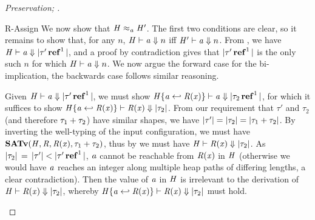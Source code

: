 \begin{proof}[Preservation; ]
\begin{rneqncase}{R-Assign}
    We now show that $ \mathit{H}   \approx _ {\mathit{a}}   \mathit{H'} $. The first two conditions are clear, so it
    remains to show that, for any $n$, $ \mathit{H} \vdash   \mathit{a}  \Downarrow  n $ iff $ \mathit{H'} \vdash   \mathit{a}  \Downarrow  n $.
    From , we have $ \mathit{H} \vdash   \mathit{a}  \Downarrow   |  \tau'  \operatorname{\mathbf{ref}}^{ 1 }  |  $, and
    a proof by contradiction gives that $ |  \tau'  \operatorname{\mathbf{ref}}^{ 1 }  | $ is the only such $n$
    for which $ \mathit{H} \vdash   \mathit{a}  \Downarrow  n $. We now argue the forward case for the bi-implication,
    the backwards case follows similar reasoning.

    Given $ \mathit{H} \vdash   \mathit{a}  \Downarrow   |  \tau'  \operatorname{\mathbf{ref}}^{ 1 }  |  $, we  must show $ \mathit{H}  \{  \mathit{a}  \hookleftarrow  \mathit{R}  (  \mathit{x}  )  \} \vdash   \mathit{a}  \Downarrow   |  \tau_{{\mathrm{2}}}  \operatorname{\mathbf{ref}}^{ 1 }  |  $, for which it suffices to show
    $ \mathit{H}  \{  \mathit{a}  \hookleftarrow  \mathit{R}  (  \mathit{x}  )  \} \vdash   \mathit{R}  (  \mathit{x}  )  \Downarrow   | \tau_{{\mathrm{2}}} |  $. 
    From our requirement that $\tau'$ and $\tau_{{\mathrm{2}}}$
    (and therefore $\tau_{{\mathrm{1}}}  +  \tau_{{\mathrm{2}}}$) have similar shapes, we have $ | \tau' |   =   | \tau_{{\mathrm{2}}} |   =   | \tau_{{\mathrm{1}}}  +  \tau_{{\mathrm{2}}} | $.
    By inverting the well-typing of the input configuration, we must have $ \mathbf{SATv} ( \mathit{H} , \mathit{R} , \mathit{R}  (  \mathit{x}  ) , \tau_{{\mathrm{1}}}  +  \tau_{{\mathrm{2}}} ) $,
    thus by  we must have $ \mathit{H} \vdash   \mathit{R}  (  \mathit{x}  )  \Downarrow   | \tau_{{\mathrm{2}}} |  $.
    As $ | \tau_{{\mathrm{2}}} |  \, = \,  | \tau' |  <  |  \tau'  \operatorname{\mathbf{ref}}^{ 1 }  | $, $\mathit{a}$ cannot be reachable from $\mathit{R}  (  \mathit{x}  )$ in $\mathit{H}$
    (otherwise we would have $\mathit{a}$ reaches an integer along multiple heap paths of differing lengths,
    a clear contradiction).
    Then the value of $\mathit{a}$ in $\mathit{H}$ is irrelevant to the derivation of $ \mathit{H} \vdash   \mathit{R}  (  \mathit{x}  )  \Downarrow   | \tau_{{\mathrm{2}}} |  $,
    whereby $ \mathit{H}  \{  \mathit{a}  \hookleftarrow  \mathit{R}  (  \mathit{x}  )  \} \vdash   \mathit{R}  (  \mathit{x}  )  \Downarrow   | \tau_{{\mathrm{2}}} |  $ must hold.


\end{rneqncase}
\end{proof}
